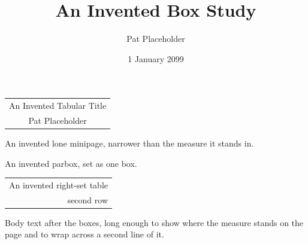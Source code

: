 \documentclass{article}
\title{An Invented Box Study}
\author{Pat Placeholder}
\date{1 January 2099}
\begin{document}
\maketitle

\begin{center}
\begin{tabular}{c}
{\LARGE An Invented Tabular Title}\\
Pat Placeholder
\end{tabular}
\end{center}

\begin{center}
\begin{minipage}{0.5\textwidth}
An invented lone minipage, narrower than the measure it stands in.
\end{minipage}
\end{center}

\begin{center}
\parbox{0.4\textwidth}{An invented parbox, set as one box.}
\end{center}

\begin{flushright}
\begin{tabular}{r}
An invented right-set table\\
second row
\end{tabular}
\end{flushright}

Body text after the boxes, long enough to show where the measure stands on
the page and to wrap across a second line of it.
\end{document}
